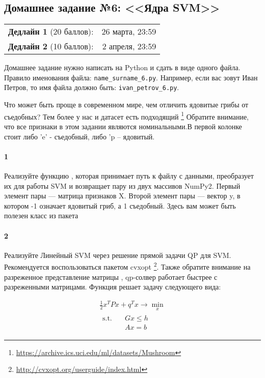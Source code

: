 \documentclass[a4paper,12pt]{article}
\begin{document}
\subsection*{Домашнее задание №6: <<Ядра SVM>>}

\begin{tabular}{@{}lr}
  \textbf{Дедлайн 1} (20 баллов): & 26 марта, 23:59 \\
  \textbf{Дедлайн 2} (10 баллов): & 2 апреля, 23:59
\end{tabular}

Домашнее задание нужно написать на Python и сдать в виде одного файла.
Правило именования файла: \texttt{name\_surname\_6.py}. Например, если
вас зовут Иван Петров, то имя файла должно быть: \texttt{ivan\_petrov\_6.py}.

\makebox[\linewidth]{\hrulefill}

Что может быть проще в современном мире, чем отличить ядовитые грибы от съедобных? Тем более у нас и датасет есть подходящий \footnote{\url{https://archive.ics.uci.edu/ml/datasets/Mushroom}} Обратите внимание, что все признаки в этом задании являются номинальными.В первой колонке стоит либо 'e' - съедобный, либо 'p -- ядовитый.

\paragraph{1} Реализуйте функцию , которая принимает путь к файлу с данными, преобразует их для работы SVM  и возвращает пару из двух массивов NumPy2. Первый элемент пары — матрица признаков X. Второй элемент пары — вектор y, в котором -1 означает ядовитый гриб, а 1 съедобный. Здесь вам может быть полезен класс  из пакета 

\paragraph{2} Реализуйте Линейный SVM через решение прямой задачи QP для SVM. Рекомендуется воспользоваться пакетом cvxopt \footnote{\url{http://cvxopt.org/userguide/index.html}}. Также обратите внимание на разреженное представление матрицы  , qp-солвер работает быстрее с разреженными матрицами.
Функция  решает задачу следующего вида:

\begin{gather}
    \frac{1}{2}x^TPx + q^Tx \to \min_{x} \\
    \begin{aligned}
        \text{s.t.} \quad & Gx \le h \\
        & Ax = b
    \end{aligned}
\end{gather}
\end{document}
